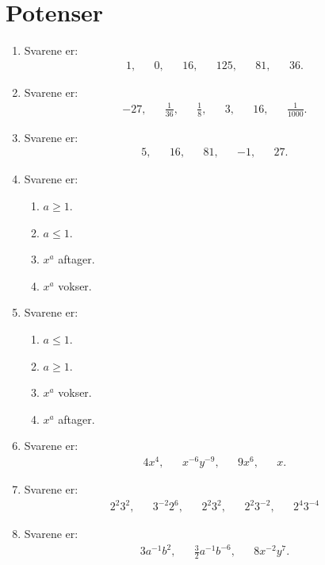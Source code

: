 \section{Potenser}
\begin{enumerate}
\item Svarene er:
\begin{align*}
1,&&0,&& 16,&&125,&& 81,&& 36.
\end{align*}
\item Svarene er:
\begin{align*}
-27,&& \frac{1}{36},&& \frac{1}{8},&& 3,&& 16,&& \frac{1}{1000}.
\end{align*}
\item Svarene er:
\begin{align*}
5,&& 16,&& 81,&& -1,&&27.
\end{align*}
\item Svarene er:
\begin{enumerate}
\item $a\geq 1$.
\item $a\leq 1$.
\item $x^a$ aftager.
\item $x^a$ vokser.
\end{enumerate}
\item Svarene er:
\begin{enumerate}
\item $a\leq 1$.
\item $a\geq 1$.
\item $x^a$ vokser.
\item $x^a$ aftager.
\end{enumerate}
 
\item Svarene er:
\begin{align*}
4x^4,&& x^{-6}y^{-9},&& 9x^6,&& x.
\end{align*}
\item Svarene er:
\begin{align*}
2^2 3^2,&& 3^{-2}2^6,&& 2^2 3^2,&& 2^2 3^{-2},&& 2^4 3^{-4}
\end{align*}
\item Svarene er:
\begin{align*}
3a^{-1}b^2,&&\frac{3}{2}a^{-1}b^{-6},&& 8x^{-2}y^7.
\end{align*}


\end{enumerate}
